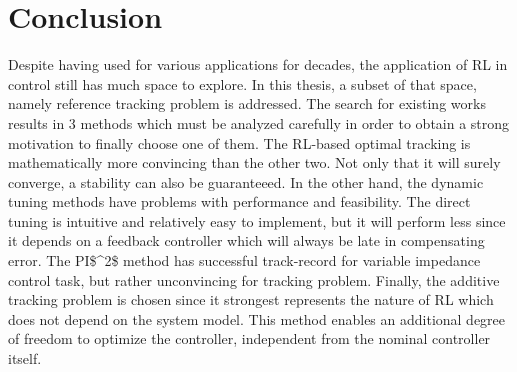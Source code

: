 \chapter{Conclusion}
Despite having used for various applications for decades, the application of \ac {RL} in control still has much space to explore. In this thesis, a subset of that space, namely reference tracking problem is addressed. The search for existing works results in 3 methods which must be analyzed carefully in order to obtain a strong motivation to finally choose one of them. The \ac {RL}-based optimal tracking is mathematically more convincing than the other two. Not only that it will surely converge, a stability can also be guaranteeed. In the other hand, the dynamic tuning methods have problems with performance and feasibility. The direct tuning is intuitive and relatively easy to implement, but it will perform less since it depends on a feedback controller which will always be late in compensating error. The \ac{PI$^2$} method has successful track-record for variable impedance control task, but rather unconvincing for tracking problem. Finally, the additive tracking problem is chosen since it strongest represents the nature of \ac {RL} which does not depend on the system model. This method enables an additional degree of freedom to optimize the controller, independent from the nominal controller itself.